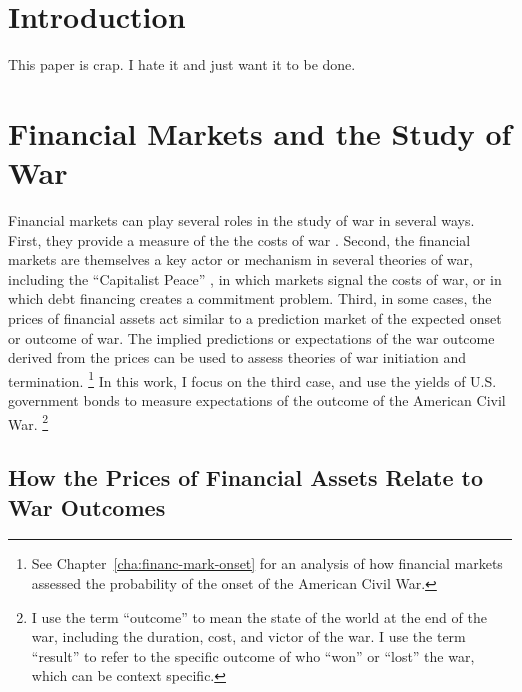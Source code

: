 





\section{Introduction}
\label{sec:introduction}



This paper is crap. I hate it and just want it to be done. 



\section{Financial Markets and the Study of War}
\label{sec:barg-theory-war}

Financial markets can play several roles in the study of war in several ways.
First, they provide a measure of the the costs of war \parencites{SchneiderTroeger2006}{GuidolinLaFerrara2010}.
Second, the financial markets are themselves a key actor or mechanism in several theories of war, including the ``Capitalist Peace'' \parencites{Gartzke2007}{DafoeKelsey2014a}, in which markets signal the costs of war, or \textcite{Slantchev2012a} in which debt financing creates a commitment problem.
Third, in some cases, the prices of financial assets act similar to a prediction market of the expected onset or outcome of war.
The implied predictions or expectations of the war outcome derived from the prices can be used to assess theories of war initiation and termination.%
\footnote{See Chapter~\ref{cha:financ-mark-onset} for an analysis of how financial markets assessed the probability of the onset of the American Civil War.}
In this work, I focus on the third case, and use the yields of U.S. government bonds to measure expectations of the outcome of the American Civil War.%
\footnote{
  I use the term ``outcome'' to mean the state of the world at the end of the war, including the duration, cost, and victor of the war.
  I use the term ``result'' to refer to the specific outcome of who ``won'' or ``lost'' the war, which can be context specific.
}

\subsection{How the Prices of Financial Assets Relate to War Outcomes}
\label{sec:how-prices-financial}

